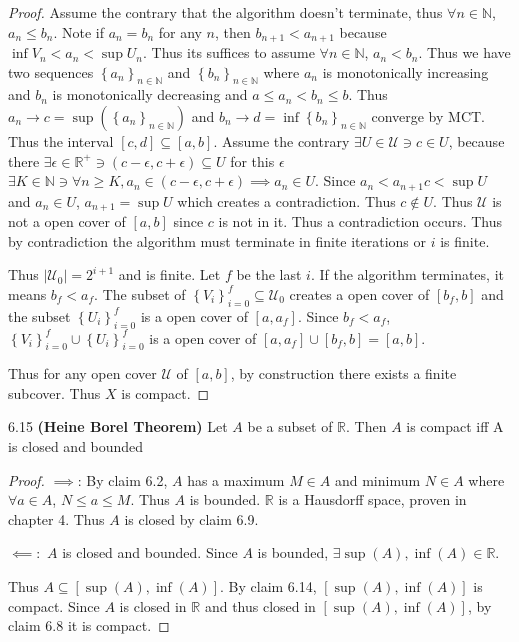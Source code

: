 \documentclass{article}
\newcommand*{\subeq}{\subseteq}
\newcommand{\R}{\mathbb{R}}
\newcommand{\N}{\mathbb{N}}
\newcommand{\abs}[1]{\left\lvert #1\right\rvert}
\begin{document}
\begin{proof}
    Assume the contrary that the algorithm doesn't terminate, thus $\forall n \in \N$, $a_n \leq b_n$. Note if $a_n = b_n$ for any $n$, then $b_{n + 1} < a_{n + 1}$ because $\inf V_n < a_n < \sup U_n$. Thus its suffices to assume $\forall n \in \N$, $a_n < b_n$. Thus we have two sequences $\left\{ a_n \right\}_{n \in \N}$ and $\left\{ b_n \right\}_{n \in \N}$ where $a_n$ is monotonically increasing and $b_n$ is monotonically decreasing and $a \leq a_n < b_n \leq b$. Thus $a_n \to c = \sup(\left\{ a_n \right\}_{n \in \N})$ and $b_n \to d = \inf\left\{ b_n \right\}_{n \in \N}$ converge by MCT. Thus the interval $[c, d] \subseteq [a, b]$. Assume the contrary $\exists U \in \mathcal{U} \ni c \in U$, because there $\exists \epsilon \in \R^+ \ni (c - \epsilon, c + \epsilon) \subeq U$ for this $\epsilon$ $\exists K \in \N \ni \forall n \geq K, a_n \in (c - \epsilon, c + \epsilon)\implies a_n \in U$. Since $a_n < a_{n + 1} c < \sup U$ and $a_n \in U$, $a_{n + 1} = \sup U$ which creates a contradiction. Thus $c \not \in U$. Thus $\mathcal{U}$ is not a open cover of $[a, b]$ since $c$ is not in it. Thus a contradiction occurs. Thus by contradiction the algorithm must terminate in finite iterations or $i$ is finite. 
    
    Thus $\abs{\mathcal{U}_0} = 2^{i + 1}$ and is finite. Let $f$ be the last $i$. If the algorithm terminates, it means $b_f < a_f$. The subset of $\left\{ V_i \right\}_{i = 0}^f \subseteq \mathcal{U}_0$ creates a open cover of $[b_f, b]$ and the subset $\left\{ U_i \right\}_{i = 0}^f$ is a open cover of $[a, a_f]$. Since $b_f < a_f$, $\left\{ V_i \right\}_{i = 0}^f \cup \left\{ U_i \right\}_{i = 0}^f$ is a open cover of $[a, a_f] \cup [b_f, b] = [a, b]$. 
    
    Thus for any open cover $\mathcal{U}$ of $[a, b]$, by construction there exists a finite subcover. Thus $X$ is compact. 
    
\end{proof}

\bigskip

\begin{claim}{6.15}\label{Claim 6.15.}
    \textbf{(Heine Borel Theorem)} Let $A$ be a subset of $\R$. Then $A$ is compact iff A is closed and bounded   
\end{claim}
\begin{proof}
    $\implies$: By claim 6.2, $A$ has a maximum $M \in A$  and minimum $N \in A$ where $\forall a \in A$, $N \leq a \leq M$. Thus $A$ is bounded. $\R$ is a Hausdorff space, proven in chapter 4. Thus $A$ is closed by claim 6.9. 
    
    $\impliedby:$ $A$ is closed and bounded. Since $A$ is bounded, $\exists \sup(A), \inf(A) \in \R$. 
    
    Thus $A \subseteq [\sup(A), \inf(A)]$. By claim 6.14, $[\sup(A), \inf(A)]$ is compact. Since $A$ is closed in $\R$ and thus closed in $[\sup(A), \inf(A)]$, by claim 6.8 it is compact.      
\end{proof}
\end{document}
